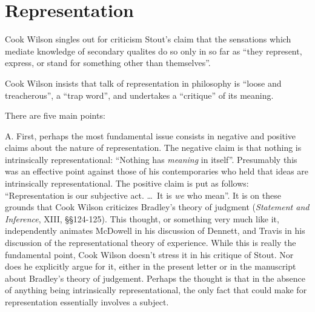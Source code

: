 \documentclass[11pt]{article}
\begin{document}

\section{Representation} %
\label{sec:representation}

Cook Wilson singles out for criticism Stout's claim that the sensations which mediate knowledge of secondary qualites do so only in so far as ``they represent, express, or stand for something other than themselves''.

Cook Wilson insists that talk of representation in philosophy is ``loose and treacherous'', a ``trap word'', and undertakes a ``critique'' of its meaning.

There are five main points:

A. First, perhaps the most fundamental issue consists in negative and positive claims about the nature of representation. The negative claim is that nothing is intrinsically representational: ``Nothing has \emph{meaning} in itself''. Presumably this was an effective point against those of his contemporaries who held that ideas are intrinsically representational. The positive claim is put as follows: ``Representation is our subjective act. \ldots\ It is \emph{we} who mean''. It is on these grounds that Cook Wilson criticizes Bradley's theory of judgment (\emph{Statement and Inference}, XIII, §§124-125). This thought, or something very much like it, independently animates McDowell in his discussion of Dennett, and Travis in his discussion of the representational theory of experience. While this is really the fundamental point, Cook Wilson doesn't stress it in his critique of Stout. Nor does he explicitly argue for it, either in the present letter or in the manuscript about Bradley's theory of judgement. Perhaps the thought is that in the absence of anything being intrinsically representational, the only fact that could make for representation essentially involves a subject.
\end{document}
